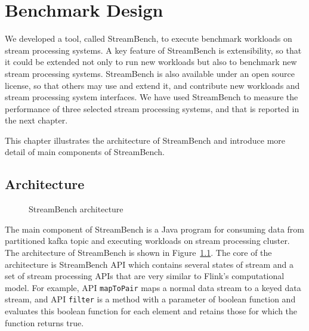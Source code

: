 \chapter{Benchmark Design}
We developed a tool, called StreamBench, to execute benchmark workloads on stream processing systems. A key feature of StreamBench is extensibility, so that it could be extended not only to run new workloads but also to benchmark new stream processing systems. StreamBench is also available under an open source license, so that others may use and extend it, and contribute new workloads and stream processing system interfaces. We have used StreamBench to measure the performance of three selected stream processing systems, and that is reported in the next chapter.

This chapter illustrates the architecture of StreamBench and introduce more detail of main components of StreamBench. 

\section{Architecture}

\begin{figure}
  \begin{center}
   \caption{StreamBench architecture}
   \label{fig:streambench_architecture}
  \end{center}
\end{figure}

The main component of StreamBench is a Java program for consuming data from partitioned kafka topic and executing workloads on stream processing cluster. The architecture of StreamBench is shown in Figure~\ref{fig:streambench_architecture}. The core of the architecture is StreamBench API which contains several states of stream and a set of stream processing APIs that are very similar to Flink's computational model. For example, API \texttt{mapToPair} maps a normal data stream to a keyed data stream, and API \texttt{filter} is a method with a parameter of boolean function and evaluates this boolean function for each element and retains those for which the function returns true. 

